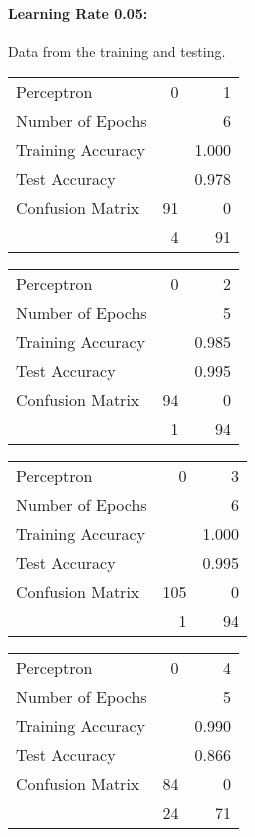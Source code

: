 \documentclass[11pt]{article}
\begin{document}
\paragraph{Learning Rate 0.05:}Data from the training and testing.\\
\begin{minipage}[t]{0.5\textwidth}
\begin{tabular}{|l | r r|}
\hline Perceptron & 0 & 1\\
Number of Epochs & & 6\\
Training Accuracy & & 1.000\\
Test Accuracy & & 0.978\\
Confusion Matrix & 91 & 0\\
 &4 & 91\\ \hline
\end{tabular}
\end{minipage}
\begin{minipage}[t]{0.5\textwidth}
\begin{tabular}{|l | r r|}
\hline Perceptron & 0 & 2\\
Number of Epochs & & 5\\
Training Accuracy & & 0.985\\
Test Accuracy & & 0.995\\
Confusion Matrix & 94 & 0\\
 &1 & 94\\ \hline
\end{tabular}
\end{minipage}
\begin{minipage}[t]{0.5\textwidth}
\begin{tabular}{|l | r r|}
\hline Perceptron & 0 & 3\\
Number of Epochs & & 6\\
Training Accuracy & & 1.000\\
Test Accuracy & & 0.995\\
Confusion Matrix & 105 & 0\\
 &1 & 94\\ \hline
\end{tabular}
\end{minipage}
\begin{minipage}[t]{0.5\textwidth}
\begin{tabular}{|l | r r|}
\hline Perceptron & 0 & 4\\
Number of Epochs & & 5\\
Training Accuracy & & 0.990\\
Test Accuracy & & 0.866\\
Confusion Matrix & 84 & 0\\
 &24 & 71\\ \hline
\end{tabular}
\end{minipage}
\end{document}
